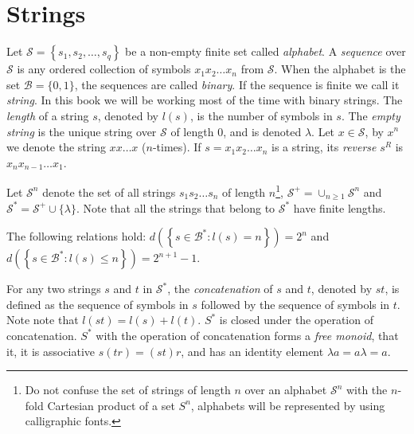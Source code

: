 %
%

\section{Strings}
\label{sec:strings}

Let $\mathcal{S}=\left\{ s_{1},s_{2},\ldots,s_{q}\right\}$ be a non-empty finite set called \emph{alphabet}. A \emph{sequence} over $\mathcal{S}$ is any ordered collection of symbols $x_1 x_2 \dots x_n$ from $\mathcal{S}$. When the alphabet is the set $\mathcal{B} = \{0, 1\}$, the sequences are called \emph{binary}. If the sequence is finite we call it \emph{string}. In this book we will be working most of the time with binary strings. The \emph{length} of a string $s$, denoted by $l(s)$, is the number of symbols in $s$. The \emph{empty string} is the unique string over $\mathcal{S}$ of length 0, and is denoted $\lambda$. Let $x \in \mathcal{S}$, by $x^n$ we denote the string $x x \ldots x$ ($n$-times). If $s = x_1 x_2 \dots x_n$ is a string, its \emph{reverse} $s^R$ is $x_n x_{n-1} \dots x_1$.

Let $\mathcal{S}^{n}$ denote the set of all strings $s_{1}s_{2}\ldots s_{n}$ of length $n$\footnote{Do not confuse the set of strings of length $n$ over an alphabet $\mathcal{S}^n$ with the $n$-fold Cartesian product of a set $S^n$, alphabets will be represented by using calligraphic fonts.}, $\mathcal{S}^{+}=\cup_{n\geq1}\mathcal{S}^{n}$ and $\mathcal{S}^{\ast} = \mathcal{S}^{+} \cup \{\lambda\}$. Note that all the strings that belong to $\mathcal{S}^{\ast}$ have finite lengths.

\begin{example}
The following relations hold: $d \left( \left\{ s \in \mathcal{B}^{\ast} : l(s) = n \right\} \right) = 2^n$ and $d \left( \left\{ s \in \mathcal{B}^{\ast} : l(s) \leq n \right\} \right) = 2^{n+1}-1$.
\end{example}

For any two strings $s$ and $t$ in $\mathcal{S}^{\ast}$, the \emph{concatenation} of $s$ and $t$, denoted by $st$, is defined as the sequence of symbols in $s$ followed by the sequence of symbols in $t$. Note note that $l(st) = l(s) + l(t)$. $S^\ast$ is closed under the operation of concatenation. $S^\ast$ with the operation of concatenation forms a \emph{free monoid}, that it, it is associative  $s(tr)=(st)r$, and has an identity element $\lambda a = a \lambda = a$.

